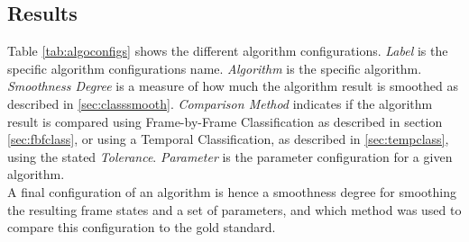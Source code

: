 \subsection{Results}
Table \ref{tab:algoconfigs} shows the different algorithm configurations. \textit{Label} is the specific algorithm configurations name. \textit{Algorithm} is the specific algorithm. \textit{Smoothness Degree} is a measure of how much the algorithm result is smoothed as described in \ref{sec:classsmooth}. \textit{Comparison Method} indicates if the algorithm result is compared using Frame-by-Frame Classification as described in section \ref{sec:fbfclass}, or using a Temporal Classification, as described in \ref{sec:tempclass}, using the stated \textit{Tolerance}. \textit{Parameter} is the parameter configuration for a given algorithm.\\
A final configuration of an algorithm is hence a smoothness degree for smoothing the resulting frame states and a set of parameters, and which method was used to compare this configuration to the gold standard.%
%
